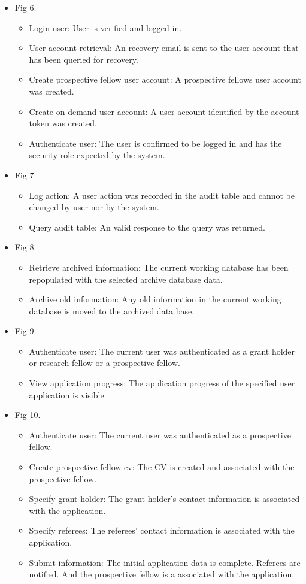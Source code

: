 \documentclass[12pt]{article}
\begin{document}
\begin{itemize}
	\item Fig 6.
		\begin{itemize}
			\item Login user: User is verified and logged in.
			\item User account retrieval: An recovery email is sent to the user account that has been queried for recovery.				
			\item Create prospective fellow user account: A prospective fellows user account was created.
			\item Create on-demand user account: A user account identified by the account token was created.
			\item Authenticate user: The user is confirmed to be logged in and has the security role expected by the system.						
		\end{itemize}
		
	\item Fig 7.
		\begin{itemize}
			\item Log action: A user action was recorded in the audit table and cannot be changed by user nor by the system.
			\item Query audit table: An valid response to the query was returned.									
		\end{itemize}
	\item Fig 8.
		\begin{itemize}
			\item Retrieve archived information: The current working database has been repopulated with the selected archive database data.
			\item Archive old information: Any old information in the current working database is moved to the archived data base.									
		\end{itemize}
	\item Fig 9.
		\begin{itemize}
			\item Authenticate user: The current user was authenticated as a grant holder or research fellow or a prospective fellow.
			\item View application progress: The application progress of the specified user application is visible.									
		\end{itemize}				
		
	\item Fig 10.
		\begin{itemize}
			\item Authenticate user: The current user was authenticated as a prospective fellow.
			\item Create prospective fellow cv: The CV is created and associated with the prospective fellow.
			\item Specify grant holder: The grant holder's contact information is associated with the application.
			\item Specify referees: The referees' contact information is associated with the application.
			\item Submit information: The initial application data is complete. Referees are notified. And the prospective fellow is a associated with the application.				
		\end{itemize}
	

\end{itemize}
\end{document}
